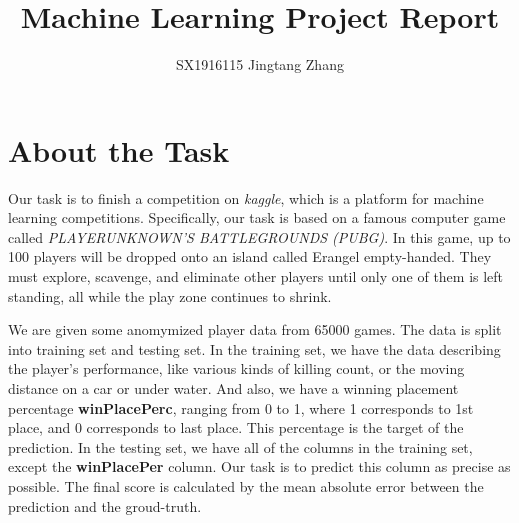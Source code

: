 \documentclass[journal=jacsat,manuscript=article]{achemso}
\author{SX1916115 Jingtang Zhang}
\affiliation[NUAA]
{CCST, NUAA, Nanjing, China}
\title[An \textsf{achemso} demo]
  {Machine Learning Project Report}
\begin{document}


\section{About the Task}

Our task is to finish a competition on \emph{kaggle}, which is a platform
for machine learning competitions. Specifically, our task is based on a
famous computer game called \emph{PLAYERUNKNOWN’S BATTLEGROUNDS (PUBG)}.
In this game, up to 100 players will be dropped onto an island called Erangel
empty-handed. They must explore, scavenge, and eliminate other players until
only one of them is left standing, all while the play zone continues to
shrink.

We are given some anomymized player data from 65000 games. The data is split
into training set and testing set. In the training set, we have the data describing
the player's performance, like various kinds of killing count, or the
moving distance on a car or under water. And also, we have a winning placement
percentage \textbf{winPlacePerc}, ranging from 0 to 1, where 1 corresponds to
1st place, and 0 corresponds to last place. This percentage is the target of
the prediction. In the testing set, we have all of the columns in the training
set, except the \textbf{winPlacePer} column. Our task is to predict this column
as precise as possible. The final score is calculated by the mean absolute error
between the prediction and the groud-truth.
\end{document}
